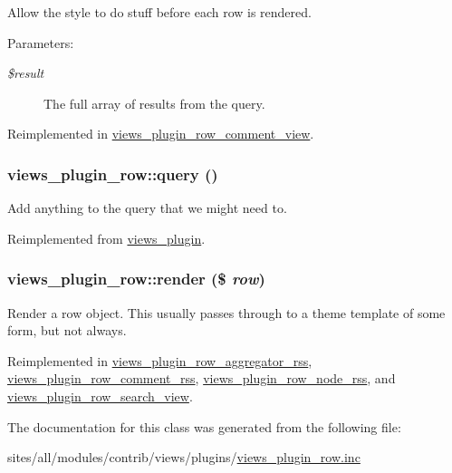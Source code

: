 Allow the style to do stuff before each row is rendered.

\begin{Desc}
\item[Parameters:]
\begin{description}
\item[{\em \$result}]The full array of results from the query. \end{description}
\end{Desc}


Reimplemented in \hyperlink{classviews__plugin__row__comment__view_0cb891a0afff2975d9a04c9d879ee5a5}{views\_\-plugin\_\-row\_\-comment\_\-view}.\hypertarget{classviews__plugin__row_bfc5a6936d485f19d49cfd9eae094f8f}{
\subsubsection[{query}]{\setlength{\rightskip}{0pt plus 5cm}views\_\-plugin\_\-row::query ()}}
\label{classviews__plugin__row_bfc5a6936d485f19d49cfd9eae094f8f}


Add anything to the query that we might need to. 

Reimplemented from \hyperlink{classviews__plugin_10ac07c47c4a8735786f9fcc38548587}{views\_\-plugin}.\hypertarget{classviews__plugin__row_8243842e087dd28664b32cef0309f2a6}{
\subsubsection[{render}]{\setlength{\rightskip}{0pt plus 5cm}views\_\-plugin\_\-row::render (\$ {\em row})}}
\label{classviews__plugin__row_8243842e087dd28664b32cef0309f2a6}


Render a row object. This usually passes through to a theme template of some form, but not always. 

Reimplemented in \hyperlink{classviews__plugin__row__aggregator__rss_dd4aa0892bf305556bb9a04c62da6027}{views\_\-plugin\_\-row\_\-aggregator\_\-rss}, \hyperlink{classviews__plugin__row__comment__rss_89b115cbc1807d3b9659627f351b97e7}{views\_\-plugin\_\-row\_\-comment\_\-rss}, \hyperlink{classviews__plugin__row__node__rss_94b9baa2d0a6e196f3da863cf1784343}{views\_\-plugin\_\-row\_\-node\_\-rss}, and \hyperlink{classviews__plugin__row__search__view_ec0c01f2e90075589b38f73381aa4ce7}{views\_\-plugin\_\-row\_\-search\_\-view}.

The documentation for this class was generated from the following file:\begin{CompactItemize}
\item 
sites/all/modules/contrib/views/plugins/\hyperlink{views__plugin__row_8inc}{views\_\-plugin\_\-row.inc}\end{CompactItemize}
